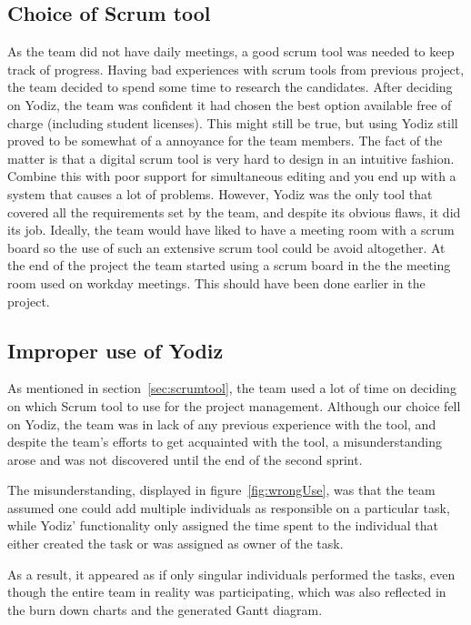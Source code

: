 \subsection{Choice of Scrum tool}
As the team did not have daily meetings, a good scrum tool was needed to keep track of progress. Having bad experiences with scrum tools from previous project, the team decided to spend some time to research the candidates. After deciding on Yodiz, the team was confident it had chosen the best option available free of charge (including student licenses). This might still be true, but using Yodiz still proved to be somewhat of a annoyance for the team members. The fact of the matter is that a digital scrum tool is very hard to design in an intuitive fashion. Combine this with poor support for simultaneous editing and you end up with a system that causes a lot of problems. However, Yodiz was the only tool that covered all the requirements set by the team, and despite its obvious flaws, it did its job. Ideally, the team would have liked to have a meeting room with a scrum board so the use of such an extensive scrum tool could be avoid altogether. At the end of the project the team started using a scrum board in the the meeting room used on workday meetings. This should have been done earlier in the project.

\subsection{Improper use of Yodiz}
\label{sec:improperScrum}
As mentioned in section~\ref{sec:scrumtool}, the team used a lot of time on
deciding on which Scrum tool to use for the project management. Although our
choice fell on Yodiz, the team was in lack of any previous experience with the
tool, and despite the team's efforts to get acquainted with the tool, a
misunderstanding arose and was not discovered until the end of the second
sprint.

The misunderstanding, displayed in figure~\ref{fig:wrongUse}, was that the team
assumed one could add multiple individuals as responsible on a particular task,
while Yodiz' functionality only assigned the time spent to the individual that
either created the task or was assigned as owner of the task.

As a result, it appeared as if only singular individuals performed the tasks,
even though the entire team in reality was participating, which was also
reflected in the burn down charts and the generated Gantt diagram. 

